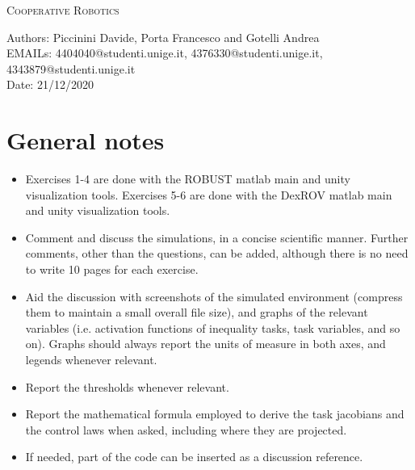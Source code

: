 \documentclass{article}
\makeatletter
\newcommand\frontmatter{%
    \cleardoublepage
  \pagenumbering{roman}}
\newcommand\mainmatter{%
    \cleardoublepage
  \pagenumbering{arabic}}
\makeatother
\begin{document}
\frontmatter
\onecolumn
\vskip 1cm
\begin{center}
\huge \textsc{Cooperative Robotics}\\
\vskip 1cm

\skip 0.5cm

\vskip 5cm

\normalsize
Authors: Piccinini Davide, Porta Francesco and Gotelli Andrea \\
EMAILs: 4404040@studenti.unige.it, 4376330@studenti.unige.it, 4343879@studenti.unige.it \\
Date: 21/12/2020
\end{center}
\clearpage
\mainmatter
\section*{General notes}

\begin{itemize}
	\item Exercises 1-4 are done with the ROBUST matlab main and unity visualization tools. Exercises 5-6 are done with the DexROV matlab main and unity visualization tools.
	\item Comment and discuss the simulations, in a concise scientific manner. Further comments, other than the questions, can be added, although there is no need to write 10 pages for each exercise.
	\item Aid the discussion with screenshots of the simulated environment (compress them to maintain a small overall file size), and graphs of the relevant variables (i.e. activation functions of inequality tasks, task variables, and so on). Graphs should always report the units of measure in both axes, and legends whenever relevant.
	\item Report the thresholds whenever relevant.
	\item Report the mathematical formula employed to derive the task jacobians and the control laws when asked, including where they are projected.
	\item If needed, part of the code can be inserted as a discussion reference.
\end{itemize}
\end{document}
